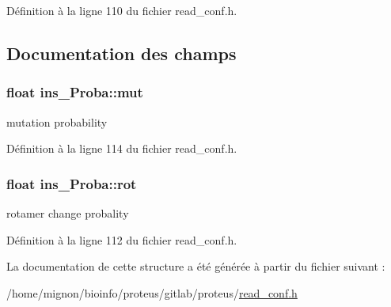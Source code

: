 Définition à la ligne 110 du fichier read\+\_\+conf.\+h.



\subsection{Documentation des champs}
\hypertarget{structins___proba_af53671eed50e63606035b392b4b2bba9}{
\subsubsection[{mut}]{\setlength{\rightskip}{0pt plus 5cm}float ins\+\_\+\+Proba\+::mut}}\label{structins___proba_af53671eed50e63606035b392b4b2bba9}


mutation probability 



Définition à la ligne 114 du fichier read\+\_\+conf.\+h.

\hypertarget{structins___proba_aea043481f2fc62dc33dc1ca86b3152dd}{
\subsubsection[{rot}]{\setlength{\rightskip}{0pt plus 5cm}float ins\+\_\+\+Proba\+::rot}}\label{structins___proba_aea043481f2fc62dc33dc1ca86b3152dd}


rotamer change probality 



Définition à la ligne 112 du fichier read\+\_\+conf.\+h.



La documentation de cette structure a été générée à partir du fichier suivant \+:\begin{DoxyCompactItemize}
\item 
/home/mignon/bioinfo/proteus/gitlab/proteus/\hyperlink{read__conf_8h}{read\+\_\+conf.\+h}\end{DoxyCompactItemize}
